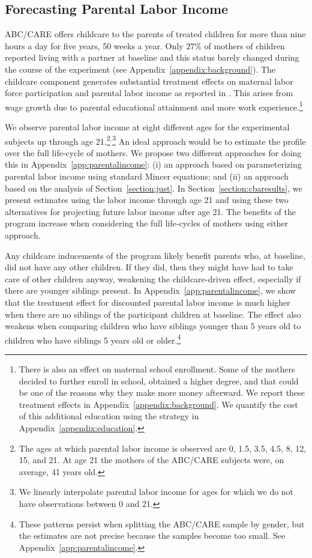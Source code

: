 \subsection{Forecasting Parental Labor Income} \label{section:pincome}

ABC/CARE offers childcare to the parents of treated children for more than nine hours a day for five years, 50 weeks a year. Only $27\%$ of mothers of children reported living with a partner at baseline and this status barely changed during the course of the experiment (see Appendix~\ref{appendix:background}). The childcare component generates substantial treatment effects on maternal labor force participation and parental labor income as reported in \cite{Garcia_Heckman_Ziff_2017_Gender-Diff_UNPUBLISHED}. This arises from wage growth due to parental educational attainment and more work experience.\footnote{There is also an effect on maternal school enrollment. Some of the mothers decided to further enroll in school, obtained a higher degree, and that could be one of the reasons why they make more money afterward. We report these treatment effects in Appendix~\ref{appendix:background}. We quantify the cost of this additional education using the strategy in Appendix~\ref{appendix:education}.}

We observe parental labor income at eight different ages for the experimental subjects up through age 21.\footnote{The ages at which parental labor income is observed are 0, 1.5, 3.5, 4.5, 8, 12, 15, and 21. At age 21 the mothers of the ABC/CARE subjects were, on average, 41 years old.}$^,$\footnote{We linearly interpolate parental labor income for ages for which we do not have observations between 0 and 21.} An ideal approach would be to estimate the profile over the full life-cycle of mothers. We propose two different approaches for doing this in Appendix~\ref{app:parentalincome}: (i) an approach based on parameterizing parental labor income using standard Mincer equations; and (ii) an approach based on the analysis of Section~\ref{section:just}. In Section~\ref{section:cbaresults}, we present estimates using the labor income through age 21 and using these two alternatives for projecting future labor income after age 21. The benefits of the program increase when considering the full life-cycles of mothers using either approach.

Any childcare inducements of the program likely benefit parents who, at baseline, did not have any other children. If they did, then they might have had to take care of other children anyway, weakening the childcare-driven effect, especially if there are younger siblings present. In Appendix~\ref{app:parentalincome}, we show that the treatment effect for discounted parental labor income is much higher when there are no siblings of the participant children at baseline. The effect also weakens when comparing children who have siblings younger than 5 years old to children who have siblings 5 years old or older.\footnote{These patterns persist when splitting the ABC/CARE sample by gender, but the estimates are not precise because the samples become too small. See Appendix~\ref{app:parentalincome}.}

